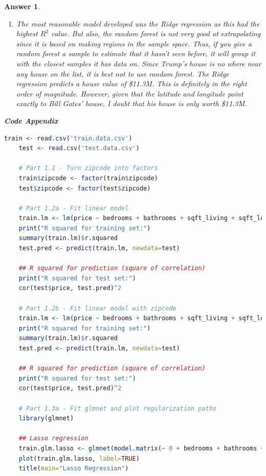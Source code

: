 \documentclass[12pt]{article}
\theoremstyle{colon}
\newtheorem*{answer}{Answer}
\begin{document}
\begin{answer}
\begin{enumerate}[label=\arabic*)]
    \item The most reasonable model developed was the Ridge regression as this had the highest $R^2$ value. But also, the random forest is not very good at extrapolating since it is based on making regions in the sample space. Thus, if you give a random forest a sample to estimate that it hasn't seen before, it will group it with the closest samples it has data on. Since Trump's house is no where near any house on the list, it is best not to use random forest. The Ridge regression predicts a house value of \$11.3M. This is definitely in the right order of magnitude. However, given that the latitude and longitude point exactly to Bill Gates' house, I doubt that his house is only worth \$11.3M.
  \end{enumerate}

  \textbf{Code Appendix}

  \begin{lstlisting}[language=R, basicstyle=\scriptsize, breaklines=true]
    train <- read.csv('train.data.csv')
    test <- read.csv('test.data.csv')

    # Part 1.1 - Turn zipcode into factors
    train$zipcode <- factor(train$zipcode)
    test$zipcode <- factor(test$zipcode)

    # Part 1.2a - Fit linear model
    train.lm <- lm(price ~ bedrooms + bathrooms + sqft_living + sqft_lot, data=train)
    print("R squared for training set:")
    summary(train.lm)$r.squared
    test.pred <- predict(train.lm, newdata=test)

    ## R squared for prediction (square of correlation)
    print("R squared for test set:")
    cor(test$price, test.pred)^2

    # Part 1.2b - Fit linear model with zipcode
    train.lm <- lm(price ~ bedrooms + bathrooms + sqft_living + sqft_lot + zipcode, data=train)
    print("R squared for training set:")
    summary(train.lm)$r.squared
    test.pred <- predict(train.lm, newdata=test)

    ## R squared for prediction (square of correlation)
    print("R squared for test set:")
    cor(test$price, test.pred)^2

    # Part 1.3a - Fit glmnet and plot regularization paths
    library(glmnet)

    ## Lasso regression
    train.glm.lasso <- glmnet(model.matrix(~ 0 + bedrooms + bathrooms + sqft_living + sqft_lot + floors + waterfront + view + condition + grade + sqft_above + sqft_basement + yr_built + yr_renovated + zipcode + lat + long + sqft_living15 + sqft_lot15, data=train), data.matrix(train$price), alpha=1)
    plot(train.glm.lasso, label=TRUE)
    title(main="Lasso Regression")


\end{lstlisting}
\end{answer}
\end{document}
